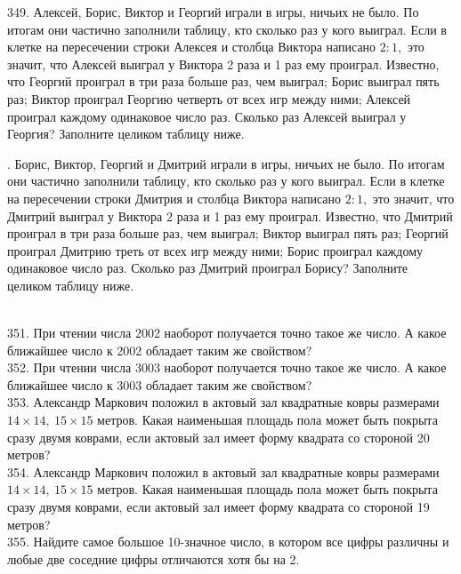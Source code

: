 349. Алексей, Борис, Виктор и Георгий играли в игры, ничьих не было. По итогам они частично заполнили таблицу, кто сколько раз у кого выиграл. Если в клетке на пересечении строки Алексея и столбца Виктора написано $2:1,$ это значит, что Алексей выиграл у Виктора 2 раза и 1 раз ему проиграл. Известно, что Георгий проиграл в три раза больше раз, чем выиграл; Борис выиграл пять раз; Виктор проиграл Георгию четверть от всех игр между ними; Алексей проиграл каждому одинаковое число раз. Сколько раз Алексей выиграл у Георгия? Заполните целиком таблицу ниже.\\
\begin{figure}[ht!]
\end{figure}\newpage{}. Борис, Виктор, Георгий и Дмитрий играли в игры, ничьих не было. По итогам они частично заполнили таблицу, кто сколько раз у кого выиграл. Если в клетке на пересечении строки Дмитрия и столбца Виктора написано $2:1,$ это значит, что Дмитрий выиграл у Виктора 2 раза и 1 раз ему проиграл. Известно, что Дмитрий проиграл в три раза больше раз, чем выиграл; Виктор выиграл пять раз; Георгий проиграл Дмитрию треть от всех игр между ними; Борис проиграл каждому одинаковое число раз. Сколько раз Дмитрий проиграл Борису? Заполните целиком таблицу ниже.\\
\begin{figure}[ht!]
\end{figure}\\
351. При чтении числа 2002 наоборот получается точно такое же число. А какое ближайшее число к 2002 обладает таким же свойством?\\
352. При чтении числа 3003 наоборот получается точно такое же число. А какое ближайшее число
к 3003 обладает таким же свойством?\\
353. Александр Маркович положил в актовый зал квадратные ковры размерами $14 \times 14,\ 15 \times 15$ метров. Какая наименьшая площадь пола может быть покрыта сразу двумя коврами, если актовый зал имеет форму квадрата со стороной 20 метров?\\
354. Александр Маркович положил в актовый зал квадратные ковры размерами $14 \times 14,\ 15 \times 15$ метров. Какая наименьшая площадь пола может быть покрыта сразу двумя коврами, если актовый зал имеет форму квадрата со стороной 19 метров?\\
355. Найдите самое большое 10-значное число, в котором все цифры различны и любые две соседние цифры отличаются хотя бы на 2.\\
